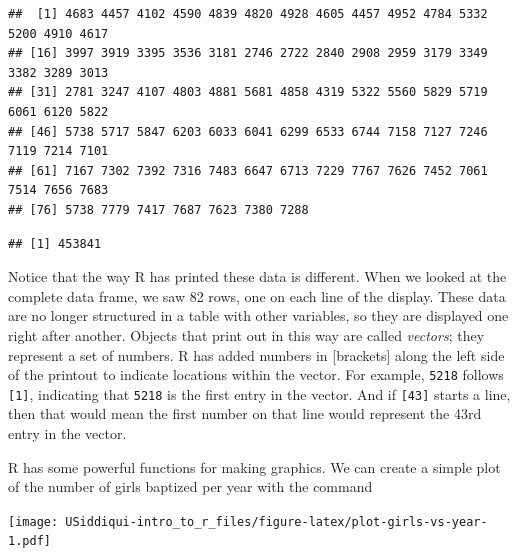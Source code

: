 \documentclass[
]{article}
\newenvironment{Shaded}{\begin{snugshade}}{\end{snugshade}}
\newcommand{\DataTypeTok}[1]{\textcolor[rgb]{0.13,0.29,0.53}{#1}}
\newcommand{\KeywordTok}[1]{\textcolor[rgb]{0.13,0.29,0.53}{\textbf{#1}}}
\newcommand{\NormalTok}[1]{#1}
\newcommand{\OperatorTok}[1]{\textcolor[rgb]{0.81,0.36,0.00}{\textbf{#1}}}
\begin{document}
\begin{verbatim}
##  [1] 4683 4457 4102 4590 4839 4820 4928 4605 4457 4952 4784 5332 5200 4910 4617
## [16] 3997 3919 3395 3536 3181 2746 2722 2840 2908 2959 3179 3349 3382 3289 3013
## [31] 2781 3247 4107 4803 4881 5681 4858 4319 5322 5560 5829 5719 6061 6120 5822
## [46] 5738 5717 5847 6203 6033 6041 6299 6533 6744 7158 7127 7246 7119 7214 7101
## [61] 7167 7302 7392 7316 7483 6647 6713 7229 7767 7626 7452 7061 7514 7656 7683
## [76] 5738 7779 7417 7687 7623 7380 7288
\end{verbatim}

\begin{Shaded}
\end{Shaded}

\begin{verbatim}
## [1] 453841
\end{verbatim}

Notice that the way R has printed these data is different. When we
looked at the complete data frame, we saw 82 rows, one on each line of
the display. These data are no longer structured in a table with other
variables, so they are displayed one right after another. Objects that
print out in this way are called \emph{vectors}; they represent a set of
numbers. R has added numbers in {[}brackets{]} along the left side of
the printout to indicate locations within the vector. For example,
\texttt{5218} follows \texttt{{[}1{]}}, indicating that \texttt{5218} is
the first entry in the vector. And if \texttt{{[}43{]}} starts a line,
then that would mean the first number on that line would represent the
43rd entry in the vector.

R has some powerful functions for making graphics. We can create a
simple plot of the number of girls baptized per year with the command

\begin{Shaded}
\end{Shaded}

\texttt{[image: USiddiqui-intro\_to\_r\_files/figure-latex/plot-girls-vs-year-1.pdf]}
\end{document}
